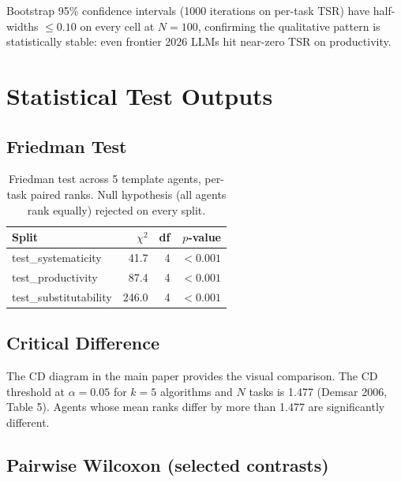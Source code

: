 ﻿\documentclass{article}
\begin{document}
Bootstrap 95\% confidence intervals (1000 iterations on per-task TSR) have
half-widths $\leq 0.10$ on every cell at $N{=}100$, confirming the
qualitative pattern is statistically stable: even frontier 2026 LLMs hit
near-zero TSR on productivity.

\section{Statistical Test Outputs}
\label{app:stats-full}

\subsection{Friedman Test}

\begin{table}[h]
    \centering
    \small
    \begin{tabular}{lrrr}
        \toprule
        Split & $\chi^2$ & df & $p$-value \\
        \midrule
        test\_systematicity    & 41.7  & 4 & $< 0.001$ \\
        test\_productivity     & 87.4  & 4 & $< 0.001$ \\
        test\_substitutability & 246.0 & 4 & $< 0.001$ \\
        \bottomrule
    \end{tabular}
    \caption{Friedman test across 5 template agents, per-task paired ranks. Null hypothesis (all agents rank equally) rejected on every split.}
    \label{tab:friedman-full}
\end{table}

\subsection{Critical Difference}

The CD diagram in the main paper provides the visual comparison. The CD threshold at
$\alpha = 0.05$ for $k = 5$ algorithms and $N$ tasks is 1.477 (Demsar 2006,
Table 5). Agents whose mean ranks differ by more than 1.477 are
significantly different.

\subsection{Pairwise Wilcoxon (selected contrasts)}
\end{document}
